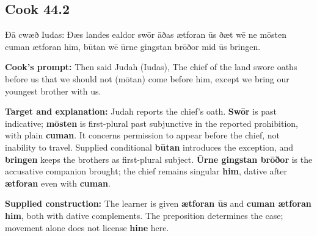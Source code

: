 \par\begin{minipage}{\linewidth}\raggedright
\subsection*{Cook 44.2}

Ðā cwæð Iudas: Ðæs landes ealdor swōr āðas ætforan ūs ðæt wē ne mōsten cuman ætforan him, būtan wē ūrne gingstan brōðor mid ūs bringen.

\textbf{Cook’s prompt:} Then said Judah (Iudas), The chief of the land swore oaths before us that we should not (mōtan) come before him, except we bring our youngest brother with us.

\textbf{Target and explanation:} Judah reports the chief’s oath. \textbf{Swōr} is past indicative; \textbf{mōsten} is first-plural past subjunctive in the reported prohibition, with plain \textbf{cuman}. It concerns permission to appear before the chief, not inability to travel. Supplied conditional \textbf{būtan} introduces the exception, and \textbf{bringen} keeps the brothers as first-plural subject. \textbf{Ūrne gingstan brōðor} is the accusative companion brought; the chief remains singular \textbf{him}, dative after \textbf{ætforan} even with \textbf{cuman}.

\textbf{Supplied construction:} The learner is given \textbf{ætforan ūs} and \textbf{cuman ætforan him}, both with dative complements. The preposition determines the case; movement alone does not license \textbf{hine} here.

\end{minipage}\par\addvspace{4pt}

